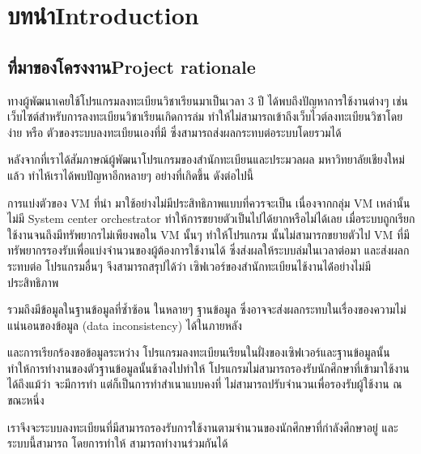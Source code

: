 \chapter{\ifcpe บทนำ\else Introduction\fi}

\section{\ifcpe ที่มาของโครงงาน\else Project rationale\fi}

ทางผู้พัฒนาเคยใช้โปรแกรมลงทะเบียนวิชาเรียนมาเป็นเวลา 3 ปี ได้พบถึงปัญหาการใช้งานต่างๆ เช่น เว็บไซต์สำหรับการลงทะเบียนวิชาเรียนเกิดการล่ม 
 ทำให้ไม่สามารถเข้าถึงเว็บไวต์ลงทะเบียนวิชาโดยง่าย หรือ ตัวของระบบลงทะเบียนเองที่มี ซึ่งสามารถส่งผลกระทบต่อระบบโดยรวมได้

หลังจากที่เราได้สัมภาษณ์ผู้พัฒนาโปรแกรมของสำนักทะเบียนและประมวลผล มหาวิทยาลัยเชียงใหม่แล้ว ทำไห้เราได้พบปัญหาอีกหลายๆ อย่างที่เกิดขึ้น ดังต่อไปนี้

การแบ่งตัวของ VM \cite{vm} ที่นำ มาใช้อย่างไม่มีประสิทธิภาพแบบที่ควรจะเป็น
เนื่องจากกลุ่ม VM เหล่านั้นไม่มี System center orchestrator \cite{sco} ทำให้การขยายตัวเป็นไปได้ยากหรือไม่ได้เลย เมื่อระบบถูกเรียกใช้งานจนถึงมีทรัพยากรไม่เพียงพอใน VM นั้นๆ ทำให้โปรแกรม นั้นไม่สามารกขยายตัวไป VM ที่มีทรัพยากรรองรับเพื่อแบ่งจำนวนของผู้ต้องการใช้งานได้ ซึ่งส่งผลให้ระบบล่มในเวลาต่อมา และส่งผลกระทบต่อ โปรแกรมอื่นๆ 
 จึงสามารถสรุปได้ว่า เซิฟเวอร์ของสำนักทะเบียนไช้งานได้่อย่างไม่มีประสิทธิภาพ

รวมถึงมีข้อมูลในฐานข้อมูลที่ซ้ำซ้อน ในหลายๆ ฐานข้อมูล ซึ่งอาจจะส่งผลกระทบในเรื่องของความไม่แน่นอนของข้อมูล (data inconsistency) ได้ในภายหลัง

และการเรียกร้องขอข้อมูลระหว่าง โปรแกรมลงทะเบียนเรียนในฝั่งของเซิฟเวอร์และฐานข้อมูลนั้น ทำให้การทำงานของตัวฐานข้อมูลนั้นช้าลงไปทำให้ โปรแกรมไม่สามารถรองรับนักศึกษาที่เข้ามาใช้งานได้ถึงแม้ว่า จะมีการทำ แต่ก็เป็นการทำสำเนาแบบคงที่ ไม่สามารถปรับจำนวนเพื่อรองรับผู้ใช้งาน ณ ขณะหนึ่ง

เราจึงจะระบบลงทะเบียนที่มีสามารถรองรับการใช้งานตามจำนวนของนักศึกษาที่กำลังศึกษาอยู่ และ ระบบนี้สามารถ โดยการทำให้ สามารถทำงานร่วมกันได้

